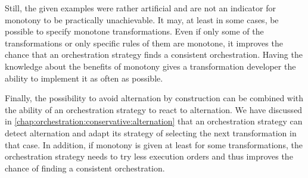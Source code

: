 Still, the given examples were rather artificial and are not an indicator for monotony to be practically unachievable.
It may, at least in some cases, be possible to specify monotone transformations.
Even if only some of the transformations or only specific rules of them are monotone, it improves the chance that an orchestration strategy finds a consistent orchestration.
Having the knowledge about the benefits of monotony gives a transformation developer the ability to implement it as often as possible.

Finally, the possibility to avoid alternation by construction can be combined with the ability of an orchestration strategy to react to alternation.
We have discussed in \autoref{chap:orchestration:conservative:alternation} that an orchestration strategy can detect alternation and adapt its strategy of selecting the next transformation in that case.
In addition, if monotony is given at least for some transformations, the orchestration strategy needs to try less execution orders and thus improves the chance of finding a consistent orchestration.


